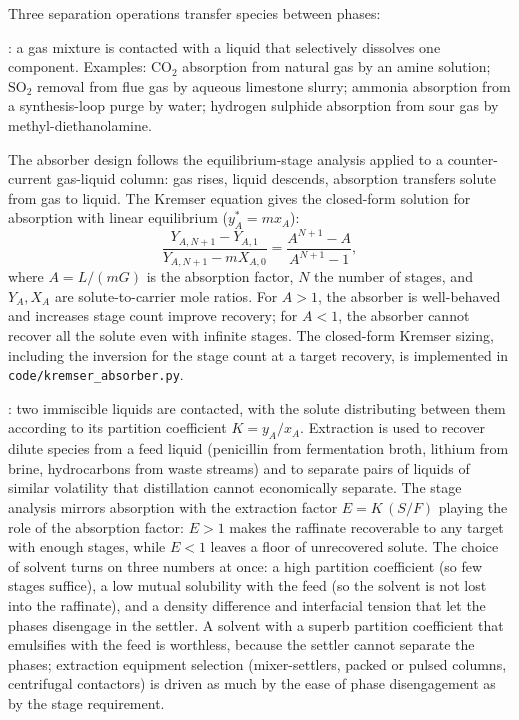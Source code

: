 Three separation operations transfer species between phases:

: a gas mixture is contacted with a liquid that
selectively dissolves one component. Examples: $\text{CO}_2$
absorption from natural gas by an amine solution; $\text{SO}_2$
removal from flue gas by aqueous limestone slurry; ammonia
absorption from a synthesis-loop purge by water; hydrogen sulphide
absorption from sour gas by methyl-diethanolamine.

The absorber design follows the equilibrium-stage analysis applied
to a counter-current gas-liquid column: gas rises, liquid descends,
absorption transfers solute from gas to liquid. The Kremser equation
gives the closed-form solution for absorption with linear equilibrium
($y_A^* = m x_A$):
\[
\frac{Y_{A,N+1} - Y_{A,1}}{Y_{A,N+1} - m X_{A,0}} = \frac{A^{N+1} - A}{
A^{N+1} - 1},
\]
where $A = L/(mG)$ is the absorption factor, $N$ the number of
stages, and $Y_A, X_A$ are solute-to-carrier mole ratios. For
$A > 1$, the absorber is well-behaved and increases stage count
improve recovery; for $A < 1$, the absorber cannot recover all the
solute even with infinite stages. The closed-form Kremser sizing,
including the inversion for the stage count at a target recovery, is
implemented in \texttt{code/kremser\_absorber.py}.

: two immiscible liquids are
contacted, with the solute distributing between them according to
its partition coefficient $K = y_A/x_A$. Extraction is used to
recover dilute species from a feed liquid (penicillin from
fermentation broth, lithium from brine, hydrocarbons from waste
streams) and to separate pairs of liquids of similar volatility
that distillation cannot economically separate. The stage analysis
mirrors absorption with the extraction factor $E = K\,(S/F)$ playing
the role of the absorption factor: $E > 1$ makes the raffinate
recoverable to any target with enough stages, while $E < 1$ leaves a
floor of unrecovered solute. The choice of solvent turns on three
numbers at once: a high partition coefficient (so few stages suffice),
a low mutual solubility with the feed (so the solvent is not lost into
the raffinate), and a density difference and interfacial tension that
let the phases disengage in the settler. A solvent with a superb
partition coefficient that emulsifies with the feed is worthless,
because the settler cannot separate the phases; extraction equipment
selection (mixer-settlers, packed or pulsed columns, centrifugal
contactors) is driven as much by the ease of phase disengagement as by
the stage requirement.

